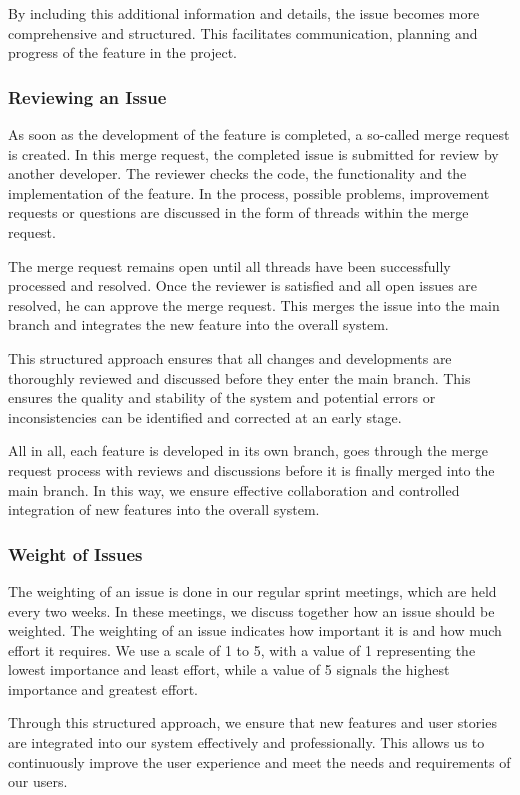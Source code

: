 \documentclass[12pt]{article}
\begin{document}
By including this additional information and details, the issue becomes more comprehensive and structured. This facilitates communication, planning and progress of the feature in the project.

\subsubsection{Reviewing an Issue}
As soon as the development of the feature is completed, a so-called merge request is created. In this merge request, the completed issue is submitted for review by another developer. The reviewer checks the code, the functionality and the implementation of the feature. In the process, possible problems, improvement requests or questions are discussed in the form of threads within the merge request.

The merge request remains open until all threads have been successfully processed and resolved. Once the reviewer is satisfied and all open issues are resolved, he can approve the merge request. This merges the issue into the main branch and integrates the new feature into the overall system.

This structured approach ensures that all changes and developments are thoroughly reviewed and discussed before they enter the main branch. This ensures the quality and stability of the system and potential errors or inconsistencies can be identified and corrected at an early stage.

All in all, each feature is developed in its own branch, goes through the merge request process with reviews and discussions before it is finally merged into the main branch. In this way, we ensure effective collaboration and controlled integration of new features into the overall system.
\subsubsection{Weight of Issues}
The weighting of an issue is done in our regular sprint meetings, which are held every two weeks. In these meetings, we discuss together how an issue should be weighted. The weighting of an issue indicates how important it is and how much effort it requires. We use a scale of 1 to 5, with a value of 1 representing the lowest importance and least effort, while a value of 5 signals the highest importance and greatest effort.

Through this structured approach, we ensure that new features and user stories are integrated into our system effectively and professionally. This allows us to continuously improve the user experience and meet the needs and requirements of our users.
\end{document}
